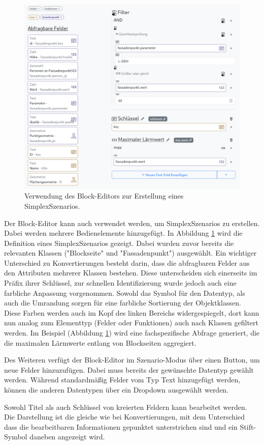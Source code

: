 \begin{figure}[ht]
  \begin{center}
    \includegraphics[width=.95\textwidth]{assets/lpz-scenario.png}
  \end{center}
  \caption{Verwendung des Block-Editors zur Erstellung eines SimplexSzenarios.}
  \label{fig:buffet-scenario}
\end{figure}

Der Block-Editor kann auch verwendet werden, um SimplexSzenarios zu erstellen. Dabei werden mehrere Bedienelemente hinzugefügt. In Abbildung \ref{fig:buffet-scenario} wird die Definition eines SimplexSzenarios gezeigt. Dabei wurden zuvor bereits die relevanten Klassen ("Blockseite" und "Fassadenpunkt") ausgewählt. Ein wichtiger Unterschied zu Konvertierungen besteht darin, dass die abfragbaren Felder aus den Attributen mehrerer Klassen bestehen. Diese unterscheiden sich einerseits im Präfix ihrer Schlüssel, zur schnellen Identifizierung wurde jedoch auch eine farbliche Anpassung vorgenommen. Sowohl das Symbol für den Datentyp, als auch die Umrandung sorgen für eine farbliche Sortierung der Objektklassen. Diese Farben werden auch im Kopf des linken Bereichs widergespiegelt, dort kann nun analog zum Elementtyp (Felder oder Funktionen) auch nach Klassen gefiltert werden. Im Beispiel (Abbildung \ref{fig:buffet-scenario}) wird eine fachspezifische Abfrage generiert, die die maximalen Lärmwerte entlang von Blockseiten aggregiert.

Des Weiteren verfügt der Block-Editor im Szenario-Modus über einen Button, um neue Felder hinzuzufügen. Dabei muss bereits der gewünschte Datentyp gewählt werden. Während standardmäßig Felder vom Typ Text hinzugefügt werden, können die anderen Datentypen über ein Dropdown ausgewählt werden.

Sowohl Titel als auch Schlüssel von kreierten Feldern kann bearbeitet werden. Die Darstellung ist die gleiche wie bei Konvertierungen, mit dem Unterschied dass die bearbeitbaren Informationen gepunktet unterstrichen sind und ein Stift-Symbol daneben angezeigt wird.

